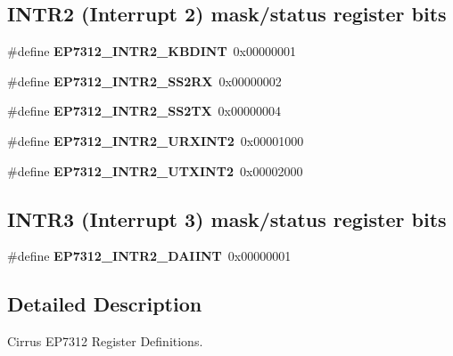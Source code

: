 \subsection*{I\+N\+T\+R2 (Interrupt 2) mask/status register bits}
\begin{DoxyCompactItemize}
\item 
\mbox{\label{group__edb7312__registers_gafc670b10f6bc0314a57a919e8b8c4e00}} 
\#define {\bfseries E\+P7312\+\_\+\+I\+N\+T\+R2\+\_\+\+K\+B\+D\+I\+NT}~0x00000001
\item 
\mbox{\label{group__edb7312__registers_ga1aac2aedb1ea5957affbf6958728dab5}} 
\#define {\bfseries E\+P7312\+\_\+\+I\+N\+T\+R2\+\_\+\+S\+S2\+RX}~0x00000002
\item 
\mbox{\label{group__edb7312__registers_gaf74af372b4334a04cab5231fed072b7a}} 
\#define {\bfseries E\+P7312\+\_\+\+I\+N\+T\+R2\+\_\+\+S\+S2\+TX}~0x00000004
\item 
\mbox{\label{group__edb7312__registers_ga0dacd03d60b0404558d31da6de0f9aec}} 
\#define {\bfseries E\+P7312\+\_\+\+I\+N\+T\+R2\+\_\+\+U\+R\+X\+I\+N\+T2}~0x00001000
\item 
\mbox{\label{group__edb7312__registers_gaa4cacbdc5694bc73e1fb4b1a9afd534a}} 
\#define {\bfseries E\+P7312\+\_\+\+I\+N\+T\+R2\+\_\+\+U\+T\+X\+I\+N\+T2}~0x00002000
\end{DoxyCompactItemize}
\subsection*{I\+N\+T\+R3 (Interrupt 3) mask/status register bits}
\begin{DoxyCompactItemize}
\item 
\mbox{\label{group__edb7312__registers_ga51d771fdc029f27f1e20befa84f93835}} 
\#define {\bfseries E\+P7312\+\_\+\+I\+N\+T\+R2\+\_\+\+D\+A\+I\+I\+NT}~0x00000001
\end{DoxyCompactItemize}


\subsection{Detailed Description}
Cirrus E\+P7312 Register Definitions. 

